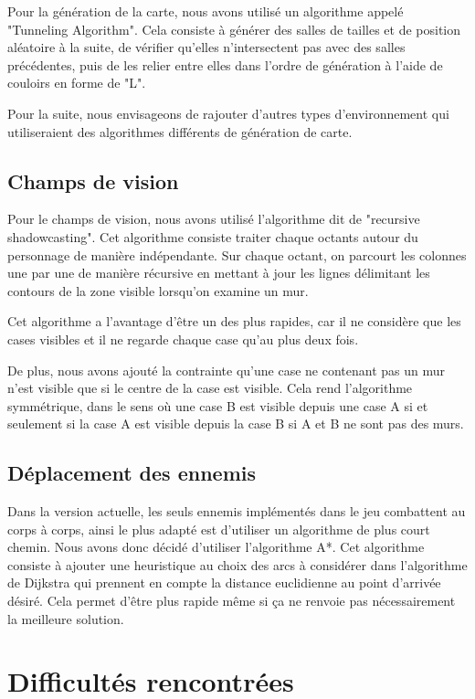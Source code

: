 \documentclass[10pt,a4paper]{article}
\begin{document}
Pour la génération de la carte, nous avons utilisé un algorithme appelé "Tunneling Algorithm". Cela consiste à générer des salles de tailles et de position aléatoire à la suite, de vérifier qu'elles n'intersectent pas avec des salles précédentes, puis de les relier entre elles dans l'ordre de génération à l'aide de couloirs en forme de "L".

Pour la suite, nous envisageons de rajouter d'autres types d'environnement qui utiliseraient des algorithmes différents de génération de carte.

\subsection{Champs de vision}

Pour le champs de vision, nous avons utilisé l'algorithme dit de "recursive shadowcasting". Cet algorithme consiste traiter chaque octants autour du personnage de manière indépendante. Sur chaque octant, on parcourt les colonnes une par une de manière récursive en mettant à jour les lignes délimitant les contours de la zone visible lorsqu'on examine un mur.

Cet algorithme a l'avantage d'être un des plus rapides, car il ne considère que les cases visibles et il ne regarde chaque case qu'au plus deux fois.

De plus, nous avons ajouté la contrainte qu'une case ne contenant pas un mur n'est visible que si le centre de la case est visible. Cela rend l'algorithme symmétrique, dans le sens où une case B est visible depuis une case A si et seulement si la case A est visible depuis la case B si A et B ne sont pas des murs.

\subsection{Déplacement des ennemis}

Dans la version actuelle, les seuls ennemis implémentés dans le jeu combattent au corps à corps, ainsi le plus adapté est d'utiliser un algorithme de plus court chemin. Nous avons donc décidé d'utiliser l'algorithme A*. Cet algorithme consiste à ajouter une heuristique au choix des arcs à considérer dans l'algorithme de Dijkstra qui prennent en compte la distance euclidienne au point d'arrivée désiré. Cela permet d'être plus rapide même si ça ne renvoie pas nécessairement la meilleure solution.

\section{Difficultés rencontrées}
\end{document}
